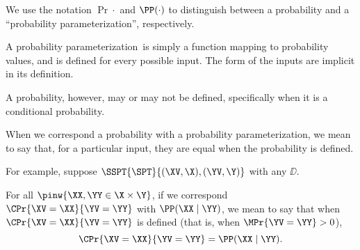 \begin{note}
  \def\paramprob{probability parameterization}
  We use the notation $\Pr{\cdot}$ and $\PP(\cdot)$ to 
  distinguish between a probability and a ``\paramprob'',
  respectively.

  A \paramprob\ is simply a function mapping 
  to probability values, and is defined for every possible input.
  The form of the inputs are implicit in its definition.

  A probability, however, may or may not be defined, specifically
  when it is a conditional probability.

  When we correspond a probability with a \paramprob,
  we mean to say that, for a particular input, 
  they are equal when the probability is defined.

  For example, suppose $\SSPT{\SPT}{(\XV,\X),(\YV,\Y)}$ with any $\DD$.

  For all $\pinw{\XX, \YY \in \X\times\Y}$,
  if we correspond $\CPr{\XV = \XX}{\YV = \YY}$ with $\PP(\XX \mid \YY)$,
  we mean to say that when $\CPr{\XV = \XX}{\YV = \YY}$ is defined (that is, when $\MPr{\YV = \YY} > 0$),
  $$\CPr{\XV = \XX}{\YV = \YY} = \PP(\XX \mid \YY).$$%
\end{note}
